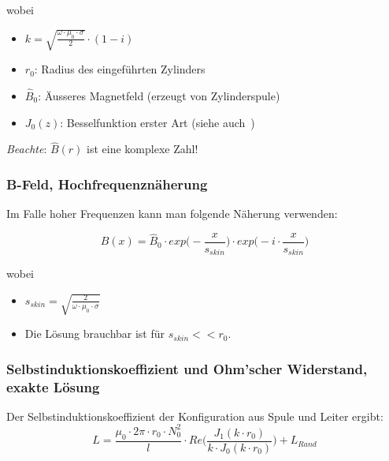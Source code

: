wobei
\begin{itemize}
    \item[]
        $k = \sqrt{\frac{\omega \cdot \mu_0 \cdot \sigma}{2}} \cdot (1-i)$
    \item[]
        $r_0$: Radius des eingef\"uhrten Zylinders
    \item[]
        $\hat{B}_0$: \"Ausseres Magnetfeld (erzeugt von Zylinderspule)
    \item[]
        $J_0(z)$: Besselfunktion erster Art (siehe auch~\cite{ref:wikipedia:bessel})
\end{itemize}

\emph{Beachte}: $\hat{B} (r)$ ist eine komplexe Zahl!


\subsubsection{B-Feld, Hochfrequenzn\"aherung}
\label{sec:arbgru:subsec:vollzylinder:bFeldapprox}


Im Falle hoher Frequenzen kann man folgende N\"aherung verwenden:

\begin{equation}
    \label{eq:vollzylinder:bFeldApprox}
    \hat{B} (x) = \hat{B}_0 \cdot exp\Biggl(-\frac{x}{s_{skin}} \Biggr) \cdot exp\Biggl(-i \cdot \frac{x}{s_{skin}} \Biggr)
\end{equation}

wobei
\begin{itemize}
    \item[]
        $s_{skin} = \sqrt{\frac{2}{\omega \cdot \mu_0 \cdot \sigma}}$
    \item[]
        Die L\"osung brauchbar ist f\"ur $s_{skin} << r_0$.
\end{itemize}




\subsubsection{Selbstinduktionskoeffizient und Ohm'scher Widerstand, exakte L\"osung}
\label{sec:arbgru:subsec:vollzylinder:LRexakt}

Der Selbstinduktionskoeffizient der Konfiguration aus Spule und Leiter ergibt:
\begin{equation}
    \label{eq:vollzylinder:LExact}
    L = \frac{\mu_0 \cdot 2\pi \cdot r_0 \cdot N_0^2}{l} \cdot Re \Biggl(\frac{J_1 (k \cdot r_0)}{k \cdot J_0 (k \cdot r_0)} \Biggr) + L_{Rand}
\end{equation}

